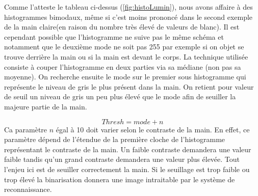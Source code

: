 Comme l’atteste le tableau ci-dessus (\autoref{fig:histoLumin}), nous avons affaire à des histogrammes bimodaux, même si c’est moins prononcé dans le second exemple de la main claire(en raison du nombre très élevé de valeurs de blanc). Il est cependant possible que l’histogramme ne suive pas le même schéma  et notamment que le deuxième mode ne soit pas 255 par exemple si on objet se trouve derrière la main ou si la main est devant le corps.
	La technique utilisée consiste à couper l’histogramme en deux parties via sa médiane (non pas sa moyenne). On recherche ensuite le mode sur le premier sous histogramme qui représente le niveau de gris le plus présent dans la main. On retient pour valeur de seuil un niveau de gris un peu plus élevé que le mode afin de seuiller la majeure partie de la main.

\[
Thresh = mode + n
\]
	Ca paramètre $n$ égal à 10 doit varier selon le contraste de la main. En effet, ce paramètre dépend de l’étendue de la première cloche de l’histogramme représentant le contraste de la main. Un faible contraste demandera une valeur faible tandis qu’un grand contraste demandera une valeur plus élevée. Tout l’enjeu ici est de seuiller correctement la main. Si le seuillage est trop faible ou trop élevé la binarisation donnera une image intraitable par le système de reconnaissance.